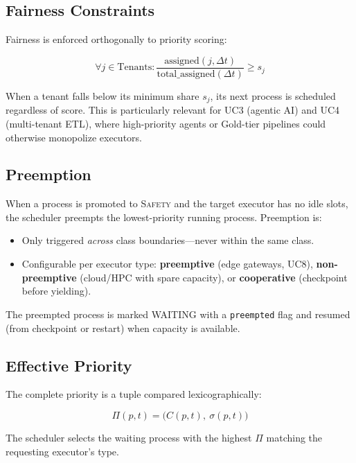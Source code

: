 \documentclass[conference]{IEEEtran}
\begin{document}
\subsection{Fairness Constraints}

Fairness is enforced orthogonally to priority scoring:

\begin{equation}
    \forall j \in \text{Tenants}: \frac{\text{assigned}(j, \Delta t)}{\text{total\_assigned}(\Delta t)} \geq s_j
\end{equation}

When a tenant falls below its minimum share $s_j$, its next process is scheduled regardless of score. This is particularly relevant for UC3 (agentic AI) and UC4 (multi-tenant ETL), where high-priority agents or Gold-tier pipelines could otherwise monopolize executors.

\subsection{Preemption}

When a process is promoted to \textsc{Safety} and the target executor has no idle slots, the scheduler preempts the lowest-priority running process. Preemption is:

\begin{itemize}
    \item Only triggered \emph{across} class boundaries---never within the same class.
    \item Configurable per executor type: \textbf{preemptive} (edge gateways, UC8), \textbf{non-preemptive} (cloud/HPC with spare capacity), or \textbf{cooperative} (checkpoint before yielding).
\end{itemize}

The preempted process is marked WAITING with a \texttt{preempted} flag and resumed (from checkpoint or restart) when capacity is available.

\subsection{Effective Priority}

The complete priority is a tuple compared lexicographically:

\begin{equation}
    \Pi(p, t) = \big(C(p, t),\ \sigma(p, t)\big)
\end{equation}

The scheduler selects the waiting process with the highest $\Pi$ matching the requesting executor's type.
\end{document}
